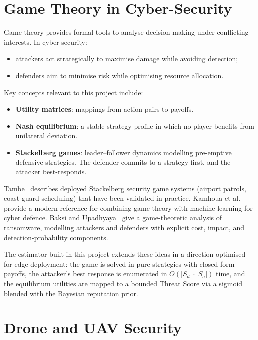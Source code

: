 \documentclass[12pt, a4paper]{report}
\begin{document}
\section{Game Theory in Cyber-Security}

Game theory provides formal tools to analyse decision-making under
conflicting interests. In cyber-security:
\begin{itemize}
    \item attackers act strategically to maximise damage while avoiding
          detection;
    \item defenders aim to minimise risk while optimising resource
          allocation.
\end{itemize}

Key concepts relevant to this project include:
\begin{itemize}
    \item \textbf{Utility matrices}: mappings from action pairs to payoffs.
    \item \textbf{Nash equilibrium}: a stable strategy profile in which no
          player benefits from unilateral deviation.
    \item \textbf{Stackelberg games}: leader--follower dynamics modelling
          pre-emptive defensive strategies. The defender commits to a
          strategy first, and the attacker best-responds.
\end{itemize}

Tambe~\cite{tambe2011security} describes deployed Stackelberg security
game systems (airport patrols, coast guard scheduling) that have been
validated in practice. Kamhoua et al.~\cite{kamhoua2021game} provide a
modern reference for combining game theory with machine learning for cyber
defence. Baksi and Upadhyaya~\cite{baksi2021game} give a game-theoretic
analysis of ransomware, modelling attackers and defenders with explicit
cost, impact, and detection-probability components.

The estimator built in this project extends these ideas in a direction
optimised for edge deployment: the game is solved in pure strategies with
closed-form payoffs, the attacker's best response is enumerated in
$O(|S_d| \cdot |S_a|)$ time, and the equilibrium utilities are mapped to a
bounded Threat Score via a sigmoid blended with the Bayesian reputation
prior.

\section{Drone and UAV Security}
\end{document}
